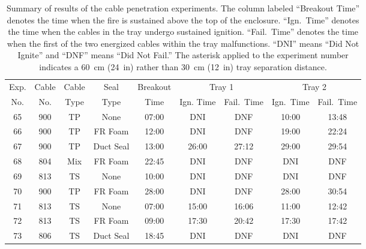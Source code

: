 \begin{table}[ht]
\centering
\caption[Summary of Cable Penetration Experiments]{Summary of results of the cable penetration experiments. The column labeled ``Breakout Time'' denotes the time when the fire is sustained above the top of the enclosure. ``Ign.~Time'' denotes the time when the cables in the tray undergo sustained ignition. ``Fail.~Time'' denotes the time when the first of the two energized cables within the tray malfunctions. ``DNI'' means ``Did Not Ignite'' and ``DNF'' means ``Did Not Fail.'' The asterisk applied to the experiment number indicates a 60~cm (24~in) rather than 30~cm (12~in) tray separation distance.}
\label{penetration_matrix}
\begin{tabular}{|c|c|c|c|c|c|c|c|c|}
\hline
Exp.   & Cable   & Cable    & Seal             & Breakout  & \multicolumn{2}{|c|}{Tray 1}  & \multicolumn{2}{|c|}{Tray 2}  \\ \cline{6-9}
No.    & No.     & Type     & Type             & Time      & Ign. Time  & Fail.~Time       & Ign.~Time  & Fail.~Time       \\ \hline
65     & 900     & TP       & None             & 07:00     & DNI        & DNF              & 10:00      & 13:48            \\ \hline
66     & 900     & TP       & FR Foam          & 12:00     & DNI        & DNF              & 19:00      & 22:24            \\ \hline
67     & 900     & TP       & Duct Seal        & 13:00     & 26:00      & 27:12            & 29:00      & 29:54            \\ \hline
68     & 804     & Mix      & FR Foam          & 22:45     & DNI        & DNF              & DNI        & DNF              \\ \hline
69     & 813     & TS       & None             & 10:00     & DNI        & DNF              & DNI        & DNF              \\ \hline
70     & 900     & TP       & FR Foam          & 28:00     & DNI        & DNF              & 28:00      & 30:54            \\ \hline
71     & 813     & TS       & None             & 07:00     & 15:00      & 16:06            & 11:00      & 12:42            \\ \hline
72     & 813     & TS       & FR Foam          & 09:00     & 17:30      & 20:42            & 17:30      & 17:42            \\ \hline
73     & 806     & TS       & Duct Seal        & 18:45     & DNI        & DNF              & DNI        & DNF              \\ \hline

\end{tabular}
\end{table}
